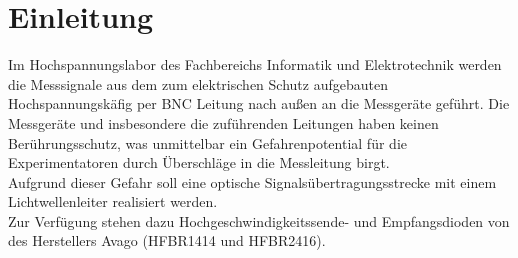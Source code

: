 \section{Einleitung}
Im Hochspannungslabor des Fachbereichs Informatik und Elektrotechnik werden die Messsignale aus dem zum elektrischen Schutz aufgebauten Hochspannungskäfig per BNC Leitung nach außen an die Messgeräte geführt. 
Die Messgeräte und insbesondere die zuführenden Leitungen haben keinen Berührungsschutz, was unmittelbar ein Gefahrenpotential für die Experimentatoren durch Überschläge in die Messleitung birgt.\\
Aufgrund dieser Gefahr soll eine optische Signalsübertragungsstrecke mit einem 
Lichtwellenleiter realisiert werden.\\
Zur Verfügung stehen dazu Hochgeschwindigkeitssende- und Empfangsdioden von des Herstellers Avago (HFBR1414 und HFBR2416).